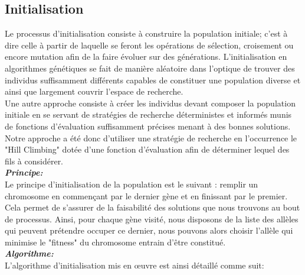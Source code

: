 \documentclass[12pt,a4paper]{article}
\begin{document}
	\subsection{Initialisation}
	Le processus d'initialisation consiste à construire la population initiale; c'est à dire celle à partir de laquelle se feront les opérations de sélection, croisement ou encore mutation afin de la faire évoluer sur des générations. L'initialisation en algorithmes génétiques se fait de manière aléatoire dans l'optique de trouver des individus suffisamment différents capables de constituer une population diverse et ainsi que largement couvrir l'espace de recherche. \\
	\hspace*{.5cm} Une autre approche consiste à créer les individus devant composer la population initiale en se servant de stratégies de recherche déterministes et informés munis de fonctions d'évaluation suffisamment précises menant à des bonnes solutions. Notre approche a été donc d'utiliser une stratégie de recherche en l’occurrence le "Hill Climbing" dotée d'une fonction d'évaluation afin de déterminer lequel des fils à considérer.\\
	\hspace*{.5cm} \textbf{\textsl{Principe:}}\\
	Le principe d'initialisation de la population est le suivant : remplir un chromosome en commençant par le dernier gène et en finissant par le premier. Cela permet de s'assurer de la faisabilité des solutions que nous trouvons au bout de processus. Ainsi, pour chaque gène visité, nous disposons de la liste des allèles qui peuvent prétendre occuper ce dernier, nous pouvons alors choisir l'allèle qui minimise le "fitness" du chromosome entrain d'être constitué.\\
	\hspace*{.5cm} \textbf{\textsl{Algorithme:}}\\	
	L'algorithme d'initialisation mis en œuvre est ainsi détaillé comme suit: \\
	
\end{document}
